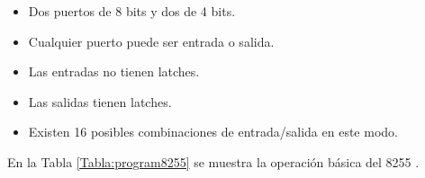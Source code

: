 \begin{itemize}
\item Dos puertos de 8 bits y dos de 4 bits.
\item Cualquier puerto puede ser entrada o salida.
\item Las entradas no tienen latches.
\item Las salidas tienen latches.
\item Existen 16 posibles combinaciones de entrada/salida en este modo.
\end{itemize}

En la Tabla \ref{Tabla:program8255} se muestra la operaci\'on b\'asica del 8255 %
\cite{Intel:Perif}.

\vspace{12pt} 
 
